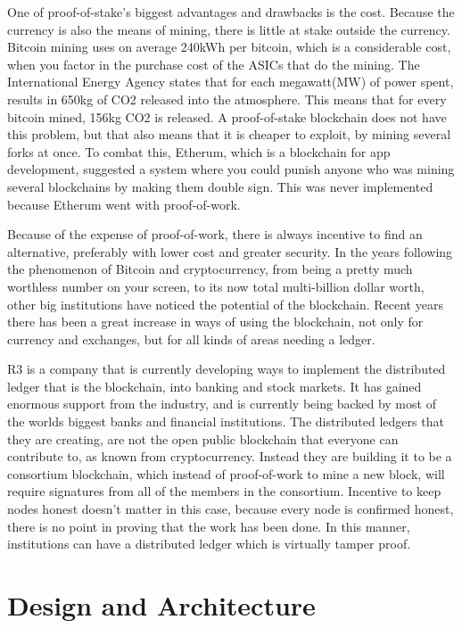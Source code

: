 \documentclass[11pt]{article}
\begin{document}
One of proof-of-stake's biggest advantages and drawbacks is the cost. Because the currency is also the means of mining, there is little at stake outside the currency. Bitcoin mining uses on average 240kWh per bitcoin, which is a considerable cost, when you factor in the purchase cost of the ASICs that do the mining. The International Energy Agency states that for each megawatt(MW) of power spent, results in 650kg of CO2 released into the atmosphere. This means that for every bitcoin mined, 156kg CO2 is released. A proof-of-stake blockchain does not have this problem, but that also means that it is cheaper to exploit, by mining several forks at once. To combat this, Etherum, which is a blockchain for app development, suggested a system where you could punish anyone who was mining several blockchains by making them double sign. This was never implemented because Etherum went with proof-of-work. 

Because of the expense of proof-of-work, there is always incentive to find an alternative, preferably with lower cost and greater security. In the years following the phenomenon of Bitcoin and cryptocurrency, from being a pretty much worthless number on your screen, to its now total multi-billion dollar worth, other big institutions have noticed the potential of the blockchain. Recent years there has been a great increase in ways of using the blockchain, not only for currency and exchanges, but for all kinds of areas needing a ledger.

R3 is a company that is currently developing ways to implement the distributed ledger that is the blockchain, into banking and stock markets. It has gained enormous support from the industry, and is currently being backed by most of the worlds biggest banks and financial institutions. The distributed ledgers that they are creating, are not the open public blockchain that everyone can contribute to, as known from cryptocurrency. Instead they are building it to be a consortium blockchain, which instead of proof-of-work to mine a new block, will require signatures from all of the members in the consortium. Incentive to keep nodes honest doesn't matter in this case, because every node is confirmed honest, there is no point in proving that the work has been done. In this manner, institutions can have a distributed ledger which is virtually tamper proof. 


\section{Design and Architecture}
\end{document}
